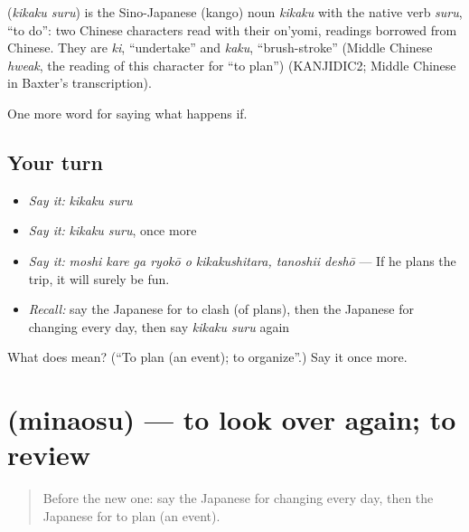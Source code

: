 \begin{cousinweb}
\textbf{} (\emph{kikaku suru}) is the Sino-Japanese (kango) noun \emph{kikaku} with the native verb \emph{suru}, \textquotedblleft{}to do\textquotedblright{}: two Chinese characters read with their on'yomi, readings borrowed from Chinese. They are \emph{ki}, \textquotedblleft{}undertake\textquotedblright{} and \emph{kaku}, \textquotedblleft{}brush-stroke\textquotedblright{} (Middle Chinese \emph{hweak}, the reading of this character for \textquotedblleft{}to plan\textquotedblright{}) (KANJIDIC2; Middle Chinese in Baxter's transcription).
\end{cousinweb}

\begin{grammarlens}[title={What you've built}]
One more word for saying what happens if.
\end{grammarlens}

\subsection*{Your turn}
\begin{itemize}
\raggedright
  \item \emph{Say it:} \emph{kikaku suru}
  \item \emph{Say it:} \emph{kikaku suru}, once more
  \item \emph{Say it:} \emph{moshi kare ga ryokō o kikakushitara, tanoshii deshō} — If he plans the trip, it will surely be fun.
  \item \emph{Recall:} say the Japanese for to clash (of plans), then the Japanese for changing every day, then say \emph{kikaku suru} again
\end{itemize}

\begin{tcolorbox}[breakable,colback=teal!4,colframe=teal!35!black,title={Before you move on}]
What does  mean? (\textquotedblleft{}To plan (an event); to organize\textquotedblright{}.) Say it once more.
\end{tcolorbox}
\section[\texorpdfstring{\ja{みなおす} (minaosu)}{みなおす (minaosu)}]{ (minaosu) — to look over again; to review}

\label{lesson:JA-C513-minaosu}



\begin{quote}
Before the new one: say the Japanese for changing every day, then the Japanese for to plan (an event).
\end{quote}

